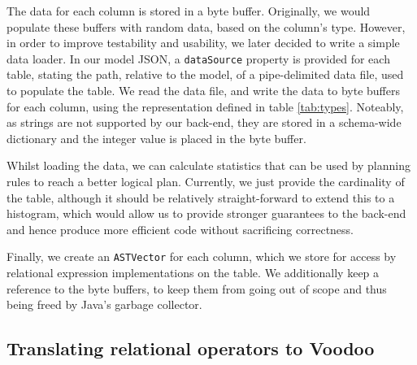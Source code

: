 The data for each column is stored in a byte buffer. Originally, we would populate these buffers with random data, based on the column's type. However, in order to improve testability and usability, we later decided to write a simple data loader. In our model JSON, a \texttt{dataSource} property is provided for each table, stating the path, relative to the model, of a pipe-delimited data file, used to populate the table. We read the data file, and write the data to byte buffers for each column, using the representation defined in table \ref{tab:types}. Noteably, as strings are not supported by our back-end, they are stored in a schema-wide dictionary and the integer value is placed in the byte buffer.

Whilst loading the data, we can calculate statistics that can be used by planning rules to reach a better logical plan. Currently, we just provide the cardinality of the table, although it should be relatively straight-forward to extend this to a histogram, which would allow us to provide stronger guarantees to the back-end and hence produce more efficient code without sacrificing correctness.

Finally, we create an \texttt{ASTVector} for each column, which we store for access by relational expression implementations on the table. We additionally keep a reference to the byte buffers, to keep them from going out of scope and thus being freed by Java's garbage collector.

\subsection{Translating relational operators to Voodoo}


